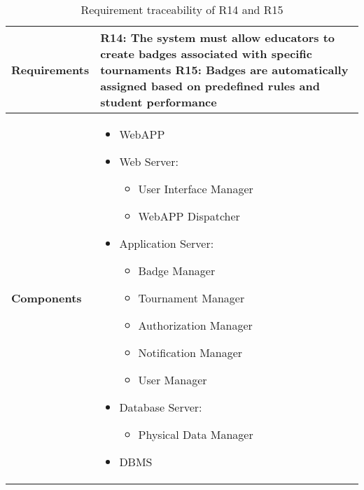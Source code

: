 \begin{table}[h!]
    \centering
    \begin{tabular}{|p{3cm}|p{12cm}|}    \hline
        \textbf{Requirements} & R14: The system must allow educators to create badges associated with specific tournaments \newline R15: Badges are automatically assigned based on predefined rules and student performance \\
    \hline
        \textbf{Components} & 
            \begin{itemize}
                \item WebAPP
                \item Web Server:
                \begin{itemize}
                    \item User Interface Manager 
                    \item WebAPP Dispatcher
                \end{itemize}
                \item Application Server:
                \begin{itemize}
                    \item Badge Manager
                    \item Tournament Manager
                    \item Authorization Manager
                    \item Notification Manager
                    \item User Manager
                \end{itemize}
                \item Database Server:
                 \begin{itemize}
                    \item Physical Data Manager
                \end{itemize}
                \item DBMS
            \end{itemize}    \\
    \hline
    \end{tabular}
    \caption{Requirement traceability of R14 and R15}
    \label{tab:r14}
\end{table}


